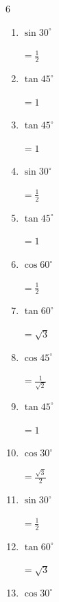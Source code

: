 \begin{multicols}{6}
\begin{enumerate}
        $\displaystyle =\frac{1}{\sqrt{3}}$

  \item $\displaystyle \sin{30^\circ}$

        $\displaystyle =\frac{1}{2}$

  \item $\displaystyle \tan{45^\circ}$

        $\displaystyle =1$

\columnbreak %

  \item $\displaystyle \tan{45^\circ}$

        $\displaystyle =1$

  \item $\displaystyle \sin{30^\circ}$

        $\displaystyle =\frac{1}{2}$

  \item $\displaystyle \tan{45^\circ}$

        $\displaystyle =1$

  \item $\displaystyle \cos{60^\circ}$

        $\displaystyle =\frac{1}{2}$

  \item $\displaystyle \tan{60^\circ}$

        $\displaystyle =\sqrt{3}$

  \item $\displaystyle \cos{45^\circ}$

        $\displaystyle =\frac{1}{\sqrt{2}}$

  \item $\displaystyle \tan{45^\circ}$

        $\displaystyle =1$

  \item $\displaystyle \cos{30^\circ}$

        $\displaystyle =\frac{\sqrt{3}}{2}$

  \item $\displaystyle \sin{30^\circ}$

        $\displaystyle =\frac{1}{2}$

  \item $\displaystyle \tan{60^\circ}$

        $\displaystyle =\sqrt{3}$

  \item $\displaystyle \cos{30^\circ}$


\end{enumerate}
\end{multicols}
